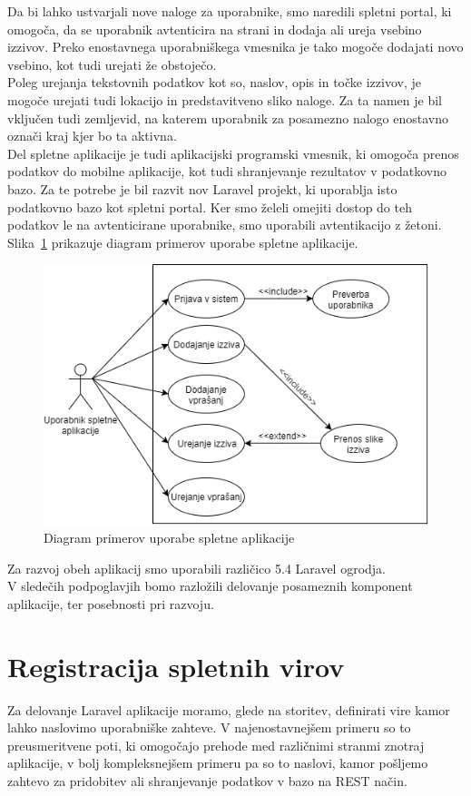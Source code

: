 \documentclass[a4paper, 12pt]{book}
\begin{document}
Da bi lahko ustvarjali nove naloge za uporabnike, smo naredili spletni portal, ki omogoča, da se uporabnik avtenticira na strani in dodaja ali ureja vsebino izzivov. Preko enostavnega uporabniškega vmesnika je tako mogoče dodajati novo vsebino, kot tudi urejati že obstoječo.\\Poleg urejanja tekstovnih podatkov kot so, naslov, opis in točke izzivov, je mogoče urejati tudi lokacijo in predstavitveno sliko naloge. Za ta namen je bil vključen tudi zemljevid, na katerem uporabnik za posamezno nalogo enostavno označi kraj kjer bo ta aktivna.\\
Del spletne aplikacije je tudi aplikacijski programski vmesnik, ki omogoča prenos podatkov do mobilne aplikacije, kot tudi shranjevanje rezultatov v podatkovno bazo. Za te potrebe je bil razvit nov Laravel projekt, ki uporablja isto podatkovno bazo kot spletni portal. Ker smo želeli omejiti dostop do teh podatkov le na avtenticirane uporabnike,  smo uporabili avtentikacijo z žetoni. Slika~\ref{UML-Spletna} prikazuje diagram primerov uporabe spletne aplikacije.

\begin{figure}[H]
\centering
\includegraphics[height=0.65\textwidth]{slike/UML-Spletna}
\caption{Diagram primerov uporabe spletne aplikacije}\label{UML-Spletna}
\end{figure}
Za razvoj obeh aplikacij smo uporabili različico 5.4 Laravel ogrodja.\\V sledečih podpoglavjih bomo razložili delovanje posameznih komponent aplikacije, ter posebnosti pri razvoju.
\newpage
\section{Registracija spletnih virov}
Za delovanje Laravel aplikacije moramo, glede na storitev, definirati vire kamor lahko naslovimo uporabniške zahteve. V najenostavnejšem primeru so to preusmeritvene poti, ki omogočajo prehode med različnimi stranmi znotraj aplikacije, v bolj kompleksnejšem primeru pa so to naslovi, kamor  pošljemo zahtevo za pridobitev ali shranjevanje podatkov v bazo na REST način.
\end{document}
